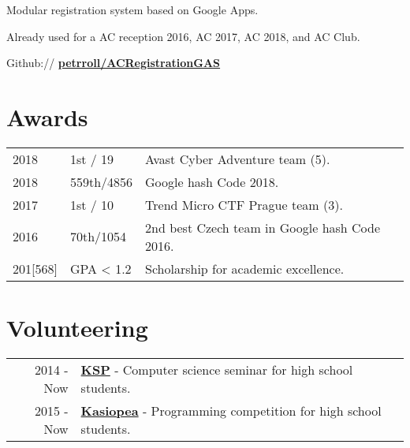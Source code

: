 \documentclass[a4paper]{deedy-resume} %
\begin{document}
\begin{minipage}[t]{0.62\textwidth}
\sectionspace %


\emptyLocation %
\begin{tightitemize}
\item Modular registration system based on Google Apps.
\item Already used for a AC reception 2016, AC 2017, AC 2018, and AC Club.
\item Github:// \href{https://github.com/petrroll/ACRegistrationGAS}{\bf petrroll/ACRegistrationGAS}
\end{tightitemize}

\sectionspace %


\section{Awards} 


\begin{tabular}{lll}
2018 & 1st / 19 & Avast Cyber Adventure team (5). \\
2018 & 559th/4856 & Google hash Code 2018. \\
2017 & 1st / 10 & Trend Micro CTF Prague team (3). \\
2016 & 70th/1054 & 2nd best Czech team in Google hash Code 2016. \\
201[568] & GPA < 1.2 & Scholarship for academic excellence. \\
\end{tabular}

\sectionspace %


\section{Volunteering} 

\begin{tabular}{rll}
2014 - Now & \href{https://ksp.mff.cuni.cz/}{\bf KSP} - Computer science seminar for high school students. \\
2015 - Now & \href{https://kasiopea.matfyz.cz/}{\bf Kasiopea} - Programming competition for high school students. \\
\end{tabular}

\sectionspace %


\end{minipage} %
\end{document}
